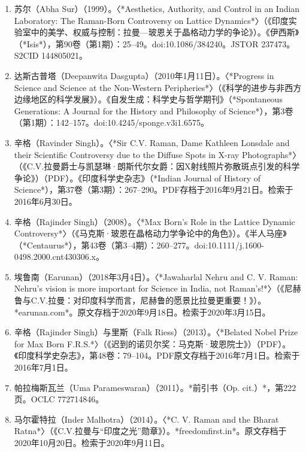 \begin{enumerate}
\item 苏尔（Abha Sur）（1999）。〈*Aesthetics, Authority, and Control in an Indian Laboratory: The Raman-Born Controversy on Lattice Dynamics*〉（《印度实验室中的美学、权威与控制：拉曼—玻恩关于晶格动力学的争论》）。《伊西斯》（*Isis*），第90卷（第1期）：25–49。doi:10.1086/384240。JSTOR 237473。S2CID 144805021。

\item 达斯古普塔（Deepanwita Dasgupta）（2010年1月11日）。〈*Progress in Science and Science at the Non-Western Peripheries*〉（《科学的进步与非西方边缘地区的科学发展》）。《自发生成：科学史与哲学期刊》（*Spontaneous Generations: A Journal for the History and Philosophy of Science*），第3卷（第1期）：142–157。doi:10.4245/sponge.v3i1.6575。

\item 辛格（Ravinder Singh）。〈*Sir C.V. Raman, Dame Kathleen Lonsdale and their Scientific Controversy due to the Diffuse Spots in X-ray Photographs*〉（《C.V.拉曼爵士与凯瑟琳·朗斯代尔女爵：因X射线照片弥散斑点引发的科学争论》）（PDF）。《印度科学史杂志》（*Indian Journal of History of Science*），第37卷（第3期）：267–290。PDF存档于2016年9月21日。检索于2016年6月30日。

\item 辛格（Rajinder Singh）（2008）。〈*Max Born's Role in the Lattice Dynamic Controversy*〉（《马克斯·玻恩在晶格动力学争论中的角色》）。《半人马座》（*Centaurus*），第43卷（第3–4期）：260–277。doi:10.1111/j.1600-0498.2000.cnt430306.x。

\item 埃鲁南（Earunan）（2018年3月4日）。〈*Jawaharlal Nehru and C. V. Raman: Nehru's vision is more important for Science in India, not Raman's!*〉（《尼赫鲁与C.V.拉曼：对印度科学而言，尼赫鲁的愿景比拉曼更重要！》）。*earunan.com*。原文存档于2020年9月18日。检索于2020年3月15日。

\item 辛格（Rajinder Singh）与里斯（Falk Riess）（2013）。〈*Belated Nobel Prize for Max Born F.R.S.*〉（《迟到的诺贝尔奖：马克斯·玻恩院士》）（PDF）。《印度科学史杂志》，第48卷：79–104。PDF原文存档于2016年7月1日。检索于2016年7月1日。

\item 帕拉梅斯瓦兰（Uma Parameswaran）（2011）。*前引书（Op. cit.）*，第222页。OCLC 772714846。

\item 马尔霍特拉（Inder Malhotra）（2014）。〈*C. V. Raman and the Bharat Ratna*〉（《C.V.拉曼与“印度之光”勋章》）。*freedomfirst.in*。原文存档于2020年10月20日。检索于2020年9月11日。


\end{enumerate}
